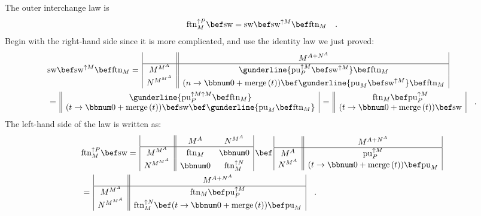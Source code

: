 The outer interchange law is
\[
\text{ftn}_{M}^{\uparrow P}\bef\text{sw}=\text{sw}\bef\text{sw}^{\uparrow M}\bef\text{ftn}_{M}\quad.
\]
Begin with the right-hand side since it is more complicated, and use
the identity law we just proved:
\begin{align*}
 & \text{sw}\bef\text{sw}^{\uparrow M}\bef\text{ftn}_{M}=\,\begin{array}{|c||c|}
 & M^{A+N^{A}}\\
\hline M^{M^{A}} & \gunderline{\text{pu}_{P}^{\uparrow M}\bef\text{sw}^{\uparrow M}}\bef\text{ftn}_{M}\\
N^{M^{M^{A}}} & (n\rightarrow\bbnum 0+\text{merge}\,(t))\bef\gunderline{\text{pu}_{M}\bef\text{sw}^{\uparrow M}}\bef\text{ftn}_{M}
\end{array}\\
 & =\,\begin{array}{||c|}
\gunderline{\text{pu}_{P}^{\uparrow M\uparrow M}\bef\text{ftn}_{M}}\\
(t\rightarrow\bbnum 0+\text{merge}\,(t))\bef\text{sw}\bef\gunderline{\text{pu}_{M}\bef\text{ftn}_{M}}
\end{array}\,=\,\begin{array}{||c|}
\text{ftn}_{M}\bef\text{pu}_{P}^{\uparrow M}\\
(t\rightarrow\bbnum 0+\text{merge}\,(t))\bef\text{sw}
\end{array}\quad.
\end{align*}
The left-hand side of the law is written as:
\begin{align*}
 & \text{ftn}_{M}^{\uparrow P}\bef\text{sw}=\,\begin{array}{|c||cc|}
 & M^{A} & N^{M^{A}}\\
\hline M^{M^{A}} & \text{ftn}_{M} & \bbnum 0\\
N^{M^{M^{A}}} & \bbnum 0 & \text{ftn}_{M}^{\uparrow N}
\end{array}\,\bef\,\begin{array}{|c||c|}
 & M^{A+N^{A}}\\
\hline M^{A} & \text{pu}_{P}^{\uparrow M}\\
N^{M^{A}} & (t\rightarrow\bbnum 0+\text{merge}\,(t))\bef\text{pu}_{M}
\end{array}\\
 & =\,\begin{array}{|c||c|}
 & M^{A+N^{A}}\\
\hline M^{M^{A}} & \text{ftn}_{M}\bef\text{pu}_{P}^{\uparrow M}\\
N^{M^{M^{A}}} & \text{ftn}_{M}^{\uparrow N}\bef(t\rightarrow\bbnum 0+\text{merge}\,(t))\bef\text{pu}_{M}
\end{array}\quad.
\end{align*}

